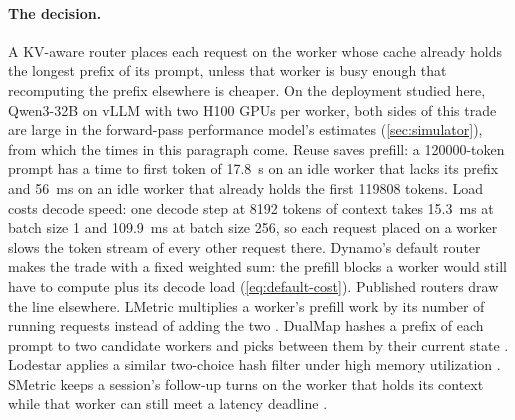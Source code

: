 \paragraph{The decision.}
A KV-aware router places each request on the worker whose cache already holds the longest prefix
of its prompt, unless that worker is busy enough that recomputing the prefix elsewhere is cheaper.
On the deployment studied here, Qwen3-32B on vLLM with two H100 GPUs per worker, both sides of this
trade are large in the forward-pass performance model's estimates (\cref{sec:simulator}), from which
the times in this paragraph come.
Reuse saves prefill: a \num{120000}-token prompt has a
time to first token of \SI{17.8}{s} on an idle worker that lacks its prefix and \SI{56}{ms} on an
idle worker that already holds the first \num{119808} tokens.
Load costs decode speed: one decode step at \num{8192} tokens of context takes \SI{15.3}{ms} at
batch size 1 and \SI{109.9}{ms} at batch size 256, so each request placed on a worker slows the
token stream of every other request there.
Dynamo's default router makes the trade with a fixed weighted sum: the prefill blocks a worker
would still have to compute plus its decode load (\cref{eq:default-cost}). Published routers draw
the line elsewhere. LMetric multiplies a worker's prefill work by its number of running requests
instead of adding the two \citep{zhang2026lmetric}. DualMap hashes a prefix of each prompt to two
candidate workers and picks between them by their current state \citep{yuan2026dualmap}. Lodestar
applies a similar two-choice hash filter under high memory utilization \citep{lim2026lodestar}. SMetric
keeps a session's follow-up turns on the worker that holds its context while that worker can still
meet a latency deadline \citep{wang2026smetric}.

